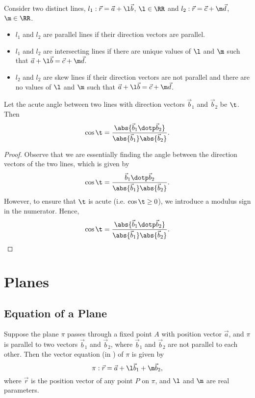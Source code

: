 \begin{recipe}
    Consider two distinct lines, $l_1 : \vec r = \vec a + \l \vec b$, $\l \in \RR$ and $l_2 : \vec r = \vec c + \m \vec d$, $\m \in \RR$.
    \begin{itemize}
        \item $l_1$ and $l_2$ are parallel lines if their direction vectors are parallel.
        \item $l_1$ and $l_2$ are intersecting lines if there are unique values of $\l$ and $\m$ such that $\vec a + \l \vec b = \vec c + \m \vec d$.
        \item $l_2$ and $l_2$ are skew lines if their direction vectors are not parallel and there are no values of $\l$ and $\m$ such that $\vec a + \l \vec b = \vec c + \m \vec d$.
    \end{itemize}
\end{recipe}

\begin{proposition}
    Let the acute angle between two lines with direction vectors $\vec b_1$ and $\vec b_2$ be $\t$. Then \[\cos\t = \frac{\abs{\vec b_1 \dotp \vec b_2}}{\abs{\vec b_1} \abs{\vec b_2}}.\]
\end{proposition}
\begin{proof}
    Observe that we are essentially finding the angle between the direction vectors of the two lines, which is given by \[\cos\t = \frac{\vec b_1 \dotp \vec b_2}{\abs{\vec b_1} \abs{\vec b_2}}.\] However, to ensure that $\t$ is acute (i.e. $\cos \t \geq 0$), we introduce a modulus sign in the numerator. Hence, \[\cos\t = \frac{\abs{\vec b_1 \dotp \vec b_2}}{\abs{\vec b_1} \abs{\vec b_2}}.\]
\end{proof}

\section{Planes}

\subsection{Equation of a Plane}

\begin{definition}
    Suppose the plane $\pi$ passes through a fixed point $A$ with position vector $\vec a$, and $\pi$ is parallel to two vectors $\vec b_1$ and $\vec b_2$, where $\vec b_1$ and $\vec b_2$ are not parallel to each other. Then the vector equation (in ) of $\pi$ is given by \[\pi : \vec r = \vec a + \l \vec b_1 + \m \vec b_2,\] where $\vec r$ is the position vector of any point $P$ on $\pi$, and $\l$ and $\m$ are real parameters.
\end{definition}

